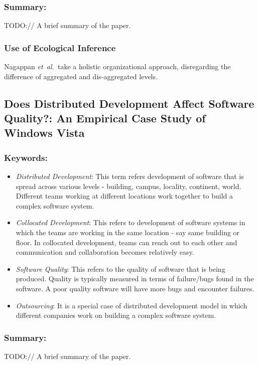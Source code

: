 \documentclass{sig-alternate-05-2015}
\newcommand{\etal}{\mbox{\emph{et al.\ }}}
\begin{document}
\subsubsection{Summary:}
TODO:// A brief summary of the paper.

\subsubsection{Use of Ecological Inference}
Nagappan \etal take a holistic organizational approach, disregarding the difference of aggregated and dis-aggregated levels.

\subsection{Does Distributed Development Affect Software Quality?: An Empirical Case Study of Windows Vista \cite{Bird:2009}}

\subsubsection{Keywords:}
\begin{itemize}
\item \emph{Distributed Development}: This term refers development of software that is spread across various levels - building, campus, locality, continent, world. Different teams working at different locations work together to build a complex software system.
\item \emph{Collocated Development}: This refers to development of software systems in which the teams are working in the same location - say same building or floor. In collocated development, teams can reach out to each other and communication and collaboration becomes relatively easy.
\item \emph{Software Quality}: This refers to the quality of software that is being produced. Quality is typically measured in terms of failure/bugs found in the software. A poor quality software will have more bugs and encounter failures.
\item \emph{Outsourcing}: It is a special case of distributed development model in which different companies work on building a complex software system.
\end{itemize} 

\subsubsection{Summary:}
TODO:// A brief summary of the paper.
\end{document}
